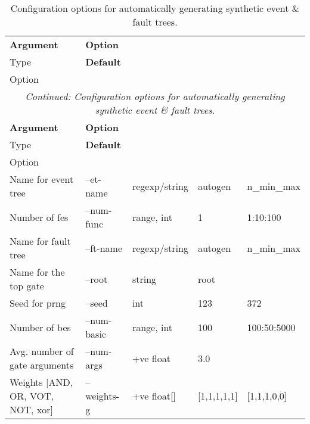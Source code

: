 \begin{longtable}{@{}lllll@{}}
\caption{Configuration options for automatically generating synthetic event \& fault trees.}
\label{tab:autogen_config_et_ft}\\
\toprule
\textbf{Argument} &
  \textbf{Option} &
  \textbf{\begin{tabular}[c]{@{}l@{}}Option\\ Type\end{tabular}} &
  \textbf{Default} &
  \textbf{\begin{tabular}[c]{@{}l@{}}Applied\\ Option\end{tabular}} \\* \midrule
\endfirsthead
\multicolumn{5}{c}{\textit{Continued: Configuration options for automatically generating synthetic event \& fault trees.}}\\
\toprule
\textbf{Argument} &
  \textbf{Option} &
  \textbf{\begin{tabular}[c]{@{}l@{}}Option\\ Type\end{tabular}} &
  \textbf{Default} &
  \textbf{\begin{tabular}[c]{@{}l@{}}Applied\\ Option\end{tabular}} \\* \midrule
\endhead
%
\bottomrule
\endfoot
%
\endlastfoot
Name for event tree                         & --et-name   & \acrshort{regexp}/string   & autogen & n\_min\_max \\
Number of \acrfull{fe}s                      & --num-func & range, int      & 1     & 1:10:100 \\
Name for fault tree                         & --ft-name   & \acrshort{regexp}/string   & autogen & n\_min\_max \\
Name for the top gate                       & --root      & string          & root    &             \\
Seed for \acrshort{prng}                               & --seed      & int             & 123     & 372         \\
Number of \acrshort{be}s                      & --num-basic & range, int      & 100     & 100:50:5000 \\
Avg. number of gate arguments            & --num-args  & +ve float       & 3.0     &             \\
Weights {[}AND, OR, VOT, NOT, \acrshort{xor}{]} & --weights-g     & +ve float{[}{]}      & {[}1,1,1,1,1{]}  & {[}1,1,1,0,0{]}         \\

\end{longtable}
